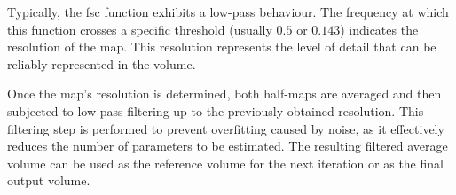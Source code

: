 \documentclass[../main.tex]{subfiles}
\begin{document}
Typically, the \gls{fsc} function exhibits a low-pass behaviour. The frequency at which this function crosses a specific threshold (usually $0.5$ or $0.143$) indicates the resolution of the map. This resolution represents the level of detail that can be reliably represented in the volume.

Once the map's resolution is determined, both half-maps are averaged and then subjected to low-pass filtering up to the previously obtained resolution. This filtering step is performed to prevent overfitting caused by noise, as it effectively reduces the number of parameters to be estimated\cite{scheres2012}. The resulting filtered average volume can be used as the reference volume for the next iteration or as the final output volume.
\end{document}
